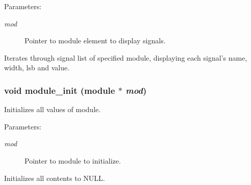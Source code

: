 \begin{Desc}
\item[Parameters: ]\par
\begin{description}
\item[{\em 
mod}]Pointer to module element to display signals.\end{description}
\end{Desc}
Iterates through signal list of specified module, displaying each signal's name, width, lsb and value. 
\subsubsection{\setlength{\rightskip}{0pt plus 5cm}void module\_\-init ({\bf module} $\ast$ {\em mod})}\label{module_8c_a0}


Initializes all values of module.

\begin{Desc}
\item[Parameters: ]\par
\begin{description}
\item[{\em 
mod}]Pointer to module to initialize.\end{description}
\end{Desc}
Initializes all contents to NULL. 